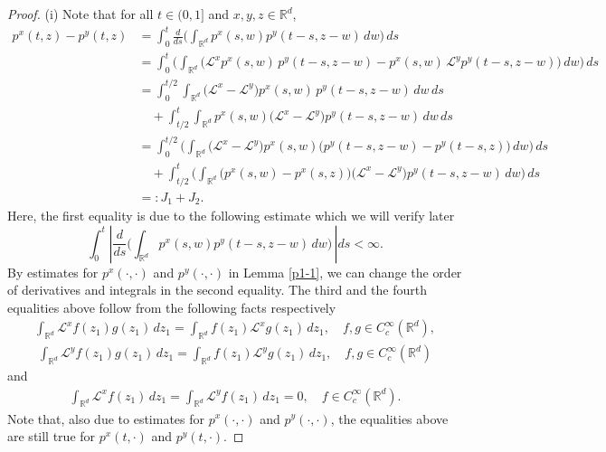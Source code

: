 \documentclass[a4paper,11pt]{amsart}
\newcommand{\R}{\mathds R}
\def\LL{{\mathcal L}}
\theoremstyle{definition}
\begin{document}
\begin{proof}
(i) Note that for all $t\in (0,1]$ and $x,y,z \in \R^d$,
\begin{equation}\label{l4-1-2}
\begin{split}
 p^x(t,z)-p^y(t,z)
&=\int_0^t \frac{d}{ds}\bigg(\int_{\R^d}p^x(s,w)p^y(t-s,z-w)\,dw\bigg)\,ds\\
&=\int_0^t \bigg(\int_{\R^d}\big( \LL^x p^x(s,w)\,p^y(t-s,z-w) -p^x(s,w)\, \LL^y
p^y(t-s,z-w)\big)\,dw\bigg)\,ds\\
&=\int_0^{{t}/{2}}\int_{\R^d}\big( \LL^x- \LL^y\big) p^x(s,w)\,p^y(t-s,z-w)\,dw\,ds\\
&\quad +\int_{{t}/{2}}^t\int_{\R^d} p^x(s,w)\big( \LL^x- \LL^y\big)
p^y(t-s,z-w)\,dw\,ds\\
&=\int_0^{{t}/{2}}\bigg(\int_{\R^d}\big( \LL^x- \LL^y\big) p^x(s,w)
\big(p^y(t-s,z-w)-p^y(t-s,z)\big)\,dw\bigg)\,ds\\
&\quad +\int_{{t}/{2}}^t\bigg(\int_{\R^d} \big(p^x(s,w)-p^x(s,z)\big) \big( \LL^x- \LL^y\big)
p^y(t-s,z-w)\,dw\bigg)\,ds\\
&=:J_1+J_2.
\end{split}
\end{equation}
Here, the first equality is due to the following estimate which we will verify later
\begin{equation*}
\int_0^t \left|\frac{d}{ds}\bigg(\int_{\R^d}p^x(s,w)p^y(t-s,z-w)\,dw\bigg)\,\right|ds<\infty.\end{equation*}
By estimates for $p^x(\cdot, \cdot)$ and $p^y(\cdot, \cdot)$ in Lemma \ref{p1-1},
we can change the order of derivatives and integrals in the second equality. The third and the fourth equalities above follow from the
following facts respectively
\begin{align*}
\int_{\R^d}  \LL^x f(z_1) g(z_1) \,dz_1=\int_{\R^d} f(z_1)  \LL^x g(z_1) \,dz_1,\quad f,g \in C_c^{\infty}(\R^d),
\end{align*}
\begin{align*}
\int_{\R^d}  \LL^y f(z_1) g(z_1)\, dz_1=\int_{\R^d} f(z_1)  \LL^y g(z_1) \, dz_1, \quad f,g \in C_c^{\infty}(\R^d)
\end{align*} and
\begin{align*}
\int_{\R^d}  \LL^x f(z_1)\,dz_1=\int_{\R^d}  \LL^y f(z_1)\,dz_1=0,\quad f \in C_c^{\infty}(\R^d).
\end{align*}
Note that, also due to estimates for $p^x(\cdot, \cdot)$ and $p^y(\cdot, \cdot)$,  the equalities above are still true for $p^x(t,\cdot)$ and $p^y(t,\cdot)$.


\end{proof}
\end{document}
